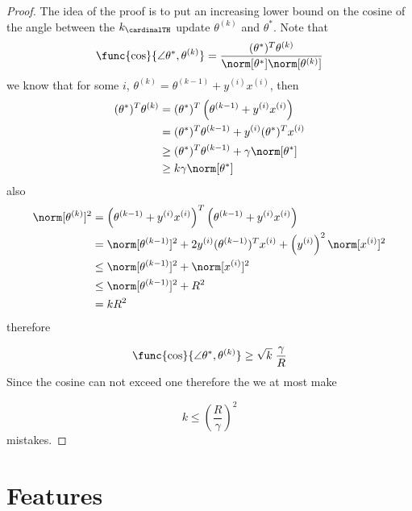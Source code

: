\begin{proof}
    The idea of the proof is to put an increasing lower bound on the cosine of the angle between the \(k_{\cardinalTH}\) update \(\theta^{(k)}\) and \(\theta^{\ast}\). Note that 
    \begin{equation*}
        \func{\cos}{\angle \theta^{\ast} , \theta^{(k)}} = \dfrac{(\theta^{\ast})^T \theta^{(k)}}{\norm[\theta^{\ast}] \norm[\theta^{(k)}]}
    \end{equation*}
    we know that for some \(i\), \(\theta^{(k)} = \theta^{(k - 1)} + y^{(i)} x^{(i)}\), then 
    \begin{align*}
        (\theta^{\ast})^T \theta^{(k)} &= (\theta^{\ast})^T \left(\theta^{(k- 1)} + y^{(i)} x^{(i)} \right) \\
        &=(\theta^{\ast})^T \theta^{(k- 1)}+   y^{(i)} (\theta^{\ast})^T x^{(i)} \\
        &\geq  (\theta^{\ast})^T \theta^{(k- 1)} + \gamma \norm[\theta^{\ast}]\\
        &\geq  k \gamma \norm[\theta^{\ast}]
    \end{align*}
    also 
    \begin{align*}
        \norm[\theta^{(k)}]^2 &=  \left(\theta^{(k- 1)} + y^{(i)} x^{(i)} \right)^T  \left(\theta^{(k- 1)} + y^{(i)} x^{(i)} \right)\\
        &= \norm[\theta^{(k-1)}]^2 + 2y^{(i)} (\theta^{(k-1)})^T x^{(i)} + \left( y^{(i)}\right)^2 \norm[x^{(i)}]^2 \\
        &\leq  \norm[\theta^{(k-1)}]^2 +  \norm[x^{(i)}]^2 \\
        &\leq  \norm[\theta^{(k-1)}]^2 + R^2 \\
        &= kR^2
    \end{align*}
    therefore 

    \begin{equation*}
        \func{\cos}{\angle \theta^{\ast} , \theta^{(k)}} \geq \sqrt{k} \; \frac{\gamma}{R}
    \end{equation*}
    Since the cosine can not exceed one therefore the we at most make 

    \begin{equation*}
        k \leq \left(\dfrac{R}{\gamma}\right)^2 
    \end{equation*}
    mistakes.
 \end{proof}

\section{Features}
